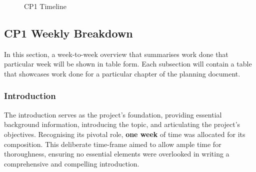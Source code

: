 \documentclass[a4paper, 12pt]{extreport}
\begin{document}
	\begin{landscape}
		\begin{figure}
			\centering
			\begin{ganttchart}[x unit=1cm, vgrid=dotted, hgrid = true]{1}{15}
				\\
				\\
				\\
				\\
				\\
				\\
				\\
				\\
				\\
				\\
			\end{ganttchart}
			\caption{CP1 Timeline}
		\end{figure}
	\end{landscape}
	
	\subsection{CP1 Weekly Breakdown}
	
	In this section, a week-to-week overview that summarises work done that particular week will be shown in table form. Each subsection will contain a table that showcases work done for a particular chapter of the planning document. 
	
	\subsubsection{Introduction}
	\label{sec:intro}
	
	The introduction serves as the project's foundation, providing essential background information, introducing the topic, and articulating the project's objectives. Recognising its pivotal role, \textbf{one week} of time was allocated for its composition. This deliberate time-frame aimed to allow ample time for thoroughness, ensuring no essential elements were overlooked in writing a comprehensive and compelling introduction.
	
\end{document}
